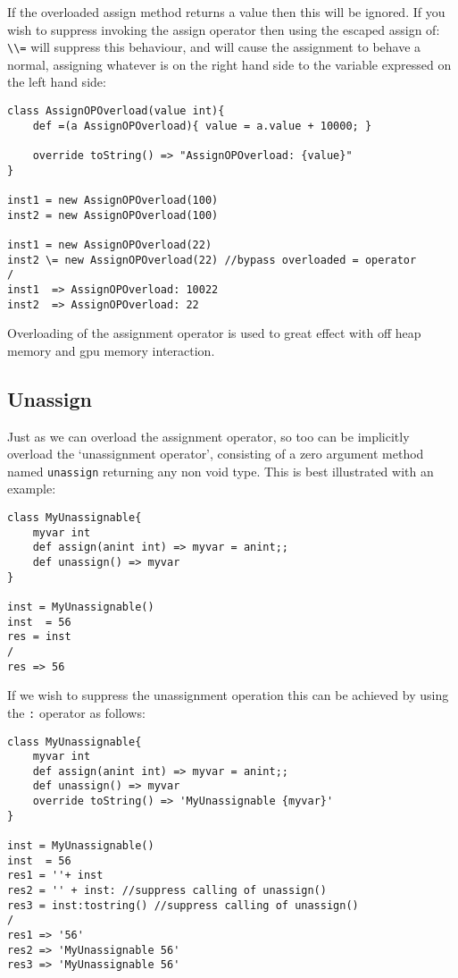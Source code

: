 \documentclass[conc-doc]{subfiles}
\begin{document}
If the overloaded assign method returns a value then this will be ignored. If you wish to suppress invoking the assign operator then using the escaped assign of: \lstinline{\\=} will suppress this behaviour, and will cause the assignment to behave a normal, assigning whatever is on the right hand side to the variable expressed on the left hand side:
\begin{lstlisting}
class AssignOPOverload(value int){	
	def =(a AssignOPOverload){ value = a.value + 10000; }
	
	override toString() => "AssignOPOverload: {value}"
}

inst1 = new AssignOPOverload(100)
inst2 = new AssignOPOverload(100)

inst1 = new AssignOPOverload(22)
inst2 \= new AssignOPOverload(22) //bypass overloaded = operator
/
inst1  => AssignOPOverload: 10022
inst2  => AssignOPOverload: 22
\end{lstlisting}

Overloading of the assignment operator is used to great effect with off heap memory and gpu memory interaction.

\subsection{Unassign}
Just as we can overload the assignment operator, so too can be implicitly overload the ‘unassignment operator’, consisting of a zero argument method named \lstinline{unassign} returning any non void type. This is best illustrated with an example:
\begin{lstlisting}
class MyUnassignable{
	myvar int
	def assign(anint int) => myvar = anint;;
	def unassign() => myvar
}

inst = MyUnassignable()
inst  = 56
res = inst 
/
res => 56
\end{lstlisting}

If we wish to suppress the unassignment operation this can be achieved by using the \lstinline{:} operator as follows:

\begin{lstlisting}
class MyUnassignable{
	myvar int
	def assign(anint int) => myvar = anint;;
	def unassign() => myvar
	override toString() => 'MyUnassignable {myvar}'
}

inst = MyUnassignable()
inst  = 56
res1 = ''+ inst 
res2 = '' + inst: //suppress calling of unassign()
res3 = inst:tostring() //suppress calling of unassign()
/
res1 => '56'
res2 => 'MyUnassignable 56'
res3 => 'MyUnassignable 56'
\end{lstlisting}
\end{document}
